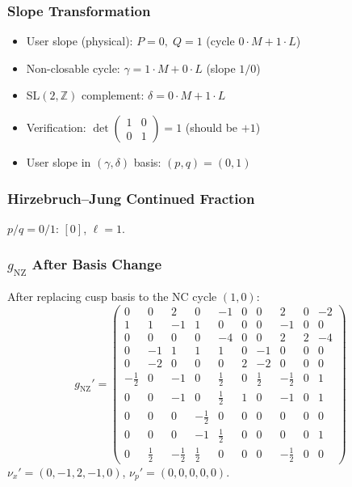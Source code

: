 \documentclass[11pt,a4paper]{article}
\begin{document}
\subsubsection{Slope Transformation}
\begin{itemize}
  \item User slope (physical): $P = 0,\; Q = 1$ (cycle $0 \cdot M + 1 \cdot L$)
  \item Non-closable cycle: $\gamma = 1 \cdot M + 0 \cdot L$ (slope $1/0$)
  \item SL$(2,\mathbb{Z})$ complement: $\delta = 0 \cdot M + 1 \cdot L$
  \item Verification: $\det \begin{pmatrix} 1 & 0 \\ 0 & 1 \end{pmatrix} = 1$ (should be $+1$)
  \item User slope in $(\gamma, \delta)$ basis: $(p, q) = (0, 1)$
\end{itemize}

\subsubsection{Hirzebruch--Jung Continued Fraction}
$p/q = 0/1$: $[0]$, $\ell = 1$.

\subsubsection{$g_{\text{NZ}}$ After Basis Change}
After replacing cusp basis to the NC cycle $(1, 0)$:
{\small
\[
g_{\text{NZ}}' = \begin{pmatrix}
0 & 0 & 2 & 0 & -1 & 0 & 0 & 2 & 0 & -2 \\
1 & 1 & -1 & 1 & 0 & 0 & 0 & -1 & 0 & 0 \\
0 & 0 & 0 & 0 & -4 & 0 & 0 & 2 & 2 & -4 \\
0 & -1 & 1 & 1 & 1 & 0 & -1 & 0 & 0 & 0 \\
0 & -2 & 0 & 0 & 0 & 2 & -2 & 0 & 0 & 0 \\
-\tfrac{1}{2} & 0 & -1 & 0 & \tfrac{1}{2} & 0 & \tfrac{1}{2} & -\tfrac{1}{2} & 0 & 1 \\
0 & 0 & -1 & 0 & \tfrac{1}{2} & 1 & 0 & -1 & 0 & 1 \\
0 & 0 & 0 & -\tfrac{1}{2} & 0 & 0 & 0 & 0 & 0 & 0 \\
0 & 0 & 0 & -1 & \tfrac{1}{2} & 0 & 0 & 0 & 0 & 1 \\
0 & \tfrac{1}{2} & -\tfrac{1}{2} & \tfrac{1}{2} & 0 & 0 & 0 & -\tfrac{1}{2} & 0 & 0
\end{pmatrix}
\]
}
$\nu_x' = (0, -1, 2, -1, 0)$, $\nu_p' = (0, 0, 0, 0, 0)$.
\end{document}

